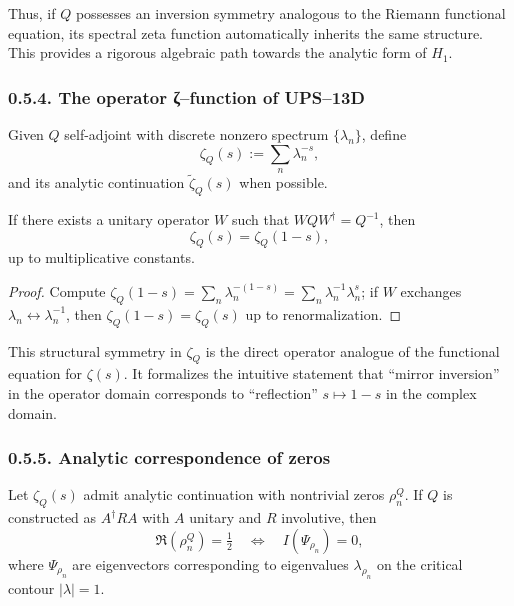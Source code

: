 \begin{remark}
Thus, if $Q$ possesses an inversion symmetry analogous to the Riemann functional equation,
its spectral zeta function automatically inherits the same structure.
This provides a rigorous algebraic path towards the analytic form of $H_1$.
\end{remark}

\subsubsection*{0.5.4. The operator ζ–function of UPS–13D}

\begin{definition}
Given $Q$ self-adjoint with discrete nonzero spectrum $\{\lambda_n\}$, define
\[
\zeta_Q(s):=\sum_n \lambda_n^{-s},
\]
and its analytic continuation $\tilde{\zeta}_Q(s)$ when possible.
\end{definition}

\begin{lemma}
If there exists a unitary operator $W$ such that $WQW^\dagger=Q^{-1}$,
then
\[
\zeta_Q(s)=\zeta_Q(1-s),
\]
up to multiplicative constants.
\end{lemma}

\begin{proof}
Compute $\zeta_Q(1-s)=\sum_n\lambda_n^{-(1-s)}=\sum_n\lambda_n^{-1}\lambda_n^s$;
if $W$ exchanges $\lambda_n\leftrightarrow \lambda_n^{-1}$, 
then $\zeta_Q(1-s)=\zeta_Q(s)$ up to renormalization.
\end{proof}

\begin{remark}
This structural symmetry in $\zeta_Q$ is the direct operator analogue of the functional equation for $\zeta(s)$.
It formalizes the intuitive statement that “mirror inversion” in the operator domain corresponds to “reflection” $s\mapsto1-s$ in the complex domain.
\end{remark}

\subsubsection*{0.5.5. Analytic correspondence of zeros}

\begin{proposition}
Let $\zeta_Q(s)$ admit analytic continuation with nontrivial zeros $\rho_n^Q$.
If $Q$ is constructed as $A^\dagger R A$ with $A$ unitary and $R$ involutive, then
\[
\Re(\rho_n^Q)=\tfrac12
\quad\Longleftrightarrow\quad
I(\Psi_{\rho_n})=0,
\]
where $\Psi_{\rho_n}$ are eigenvectors corresponding to eigenvalues $\lambda_{\rho_n}$ on the critical contour $|\lambda|=1$.
\end{proposition}

